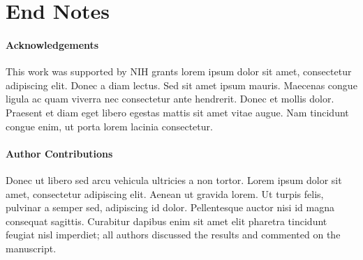 
\section*{End Notes}

\paragraph{Acknowledgements} This work was supported by NIH grants lorem ipsum dolor sit amet, consectetur adipiscing
elit. Donec a diam lectus. Sed sit amet ipsum mauris. Maecenas congue ligula ac quam viverra nec consectetur ante
hendrerit. Donec et mollis dolor. Praesent et diam eget libero egestas mattis sit amet vitae augue. Nam tincidunt
congue enim, ut porta lorem lacinia consectetur.

\paragraph{Author Contributions} Donec ut libero sed arcu vehicula ultricies a non tortor. Lorem ipsum dolor sit amet,
consectetur adipiscing elit. Aenean ut gravida lorem. Ut turpis felis, pulvinar a semper sed, adipiscing id dolor.
Pellentesque auctor nisi id magna consequat sagittis. Curabitur dapibus enim sit amet elit pharetra tincidunt feugiat
nisl imperdiet; all authors discussed the results and commented on the manuscript.

